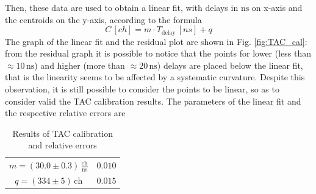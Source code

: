 \documentclass[a4paper]{article}
\begin{document}

Then, these data are used to obtain a linear fit, with delays in $\mathrm{ns}$ on x-axis and the centroids on the y-axis, according to the formula%
\begin{equation}\label{eq: measured time}
   C\,[ch]=m\cdot T_{\mathrm{delay}}\,[ns]+q
\end{equation}
The graph of the linear fit and the residual plot are shown in Fig. \ref{fig:TAC_cal}: from the residual graph it is possible to notice that the points for lower (less than $\approx\!\!10\,\mathrm{ns}$) and higher (more than $\approx\!\!20\,\mathrm{ns}$) delays are placed below the linear fit, that is the linearity seems to be affected by a systematic curvature. Despite this observation, it is still possible to consider the points to be linear, so as to consider valid the TAC calibration results. The parameters of the linear fit and the respective relative errors are
\begin{table}[H]
    \centering
    \begin{tabular}{c|c}
    \hline
    $m=(30.0\pm0.3) \, \frac{\mathrm{ch}}{\mathrm{ns}}$ & $0.010$\\
    $q=(334\pm5) \,\mathrm{ch}$ & $0.015$\\
    \hline
    \end{tabular}
    \caption{Results of TAC calibration and relative errors}
    \label{tab:TAC_cal_results}
\end{table}
\end{document}
